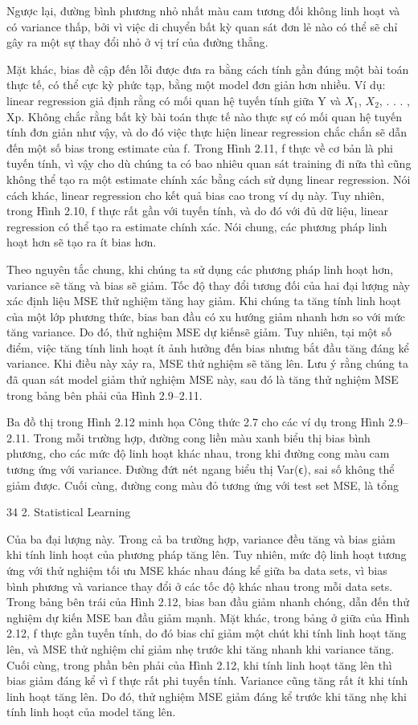 Ngược lại, đường bình phương nhỏ nhất màu cam tương đối không linh hoạt và có variance thấp, bởi vì việc di chuyển bất kỳ quan sát đơn lẻ nào có thể sẽ chỉ gây ra một sự thay đổi nhỏ ở vị trí của đường thẳng.

Mặt khác, bias đề cập đến lỗi được đưa ra bằng cách tính gần đúng một bài toán thực tế, có thể cực kỳ phức tạp, bằng một model đơn giản hơn nhiều. Ví dụ: linear regression giả định rằng có mối quan hệ tuyến tính giữa Y và $X_{1}$, $X_{2}$, . . . , Xp. Không chắc rằng bất kỳ bài toán thực tế nào thực sự có mối quan hệ tuyến tính đơn giản như vậy, và do đó việc thực hiện linear regression chắc chắn sẽ dẫn đến một số bias trong estimate của f. Trong Hình 2.11, f thực về cơ bản là phi tuyến tính, vì vậy cho dù chúng ta có bao nhiêu quan sát training đi nữa thì cũng không thể tạo ra một estimate chính xác bằng cách sử dụng linear regression. Nói cách khác, linear regression cho kết quả bias cao trong ví dụ này. Tuy nhiên, trong Hình 2.10, f thực rất gần với tuyến tính, và do đó với đủ dữ liệu, linear regression có thể tạo ra estimate chính xác. Nói chung, các phương pháp linh hoạt hơn sẽ tạo ra ít bias hơn.

Theo nguyên tắc chung, khi chúng ta sử dụng các phương pháp linh hoạt hơn, variance sẽ tăng và bias sẽ giảm. Tốc độ thay đổi tương đối của hai đại lượng này xác định liệu MSE thử nghiệm tăng hay giảm. Khi chúng ta tăng tính linh hoạt của một lớp phương thức, bias ban đầu có xu hướng giảm nhanh hơn so với mức tăng variance. Do đó, thử nghiệm MSE dự kiến ​​sẽ giảm. Tuy nhiên, tại một số điểm, việc tăng tính linh hoạt ít ảnh hưởng đến bias nhưng bắt đầu tăng đáng kể variance. Khi điều này xảy ra, MSE thử nghiệm sẽ tăng lên. Lưu ý rằng chúng ta đã quan sát model giảm thử nghiệm MSE này, sau đó là tăng thử nghiệm MSE trong bảng bên phải của Hình 2.9–2.11.

Ba đồ thị trong Hình 2.12 minh họa Công thức 2.7 cho các ví dụ trong Hình 2.9–2.11. Trong mỗi trường hợp, đường cong liền màu xanh biểu thị bias bình phương, cho các mức độ linh hoạt khác nhau, trong khi đường cong màu cam tương ứng với variance. Đường đứt nét ngang biểu thị Var(ϵ), sai số không thể giảm được. Cuối cùng, đường cong màu đỏ tương ứng với test set MSE, là tổng

34 2. Statistical Learning

Của ba đại lượng này. Trong cả ba trường hợp, variance đều tăng và bias giảm khi tính linh hoạt của phương pháp tăng lên. Tuy nhiên, mức độ linh hoạt tương ứng với thử nghiệm tối ưu MSE khác nhau đáng kể giữa ba data sets, vì bias bình phương và variance thay đổi ở các tốc độ khác nhau trong mỗi data sets. Trong bảng bên trái của Hình 2.12, bias ban đầu giảm nhanh chóng, dẫn đến thử nghiệm dự kiến ​​MSE ban đầu giảm mạnh. Mặt khác, trong bảng ở giữa của Hình 2.12, f thực gần tuyến tính, do đó bias chỉ giảm một chút khi tính linh hoạt tăng lên, và MSE thử nghiệm chỉ giảm nhẹ trước khi tăng nhanh khi variance tăng. Cuối cùng, trong phần bên phải của Hình 2.12, khi tính linh hoạt tăng lên thì bias giảm đáng kể vì f thực rất phi tuyến tính. Variance cũng tăng rất ít khi tính linh hoạt tăng lên. Do đó, thử nghiệm MSE giảm đáng kể trước khi tăng nhẹ khi tính linh hoạt của model tăng lên.


